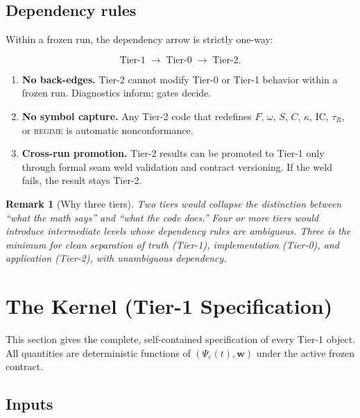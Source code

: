 \documentclass[
  aps,
  prd,
  twocolumn,
  superscriptaddress,
  nofootinbib,
  floatfix
]{revtex4-2}
\newtheorem{remark}{Remark}
\newcommand{\tR}{\tau_{\!R}}
\newcommand{\eps}{\varepsilon}
\newcommand{\beq}{\begin{equation}}
\newcommand{\eeq}{\end{equation}}
\newcommand{\regime}[1]{\textrm{\scshape#1}}
\newcommand{\wvec}{\mathbf{w}}
\newcommand{\IC}{\mathrm{IC}}
\begin{document}
\subsection{Dependency rules}

Within a frozen run, the dependency arrow is strictly one-way:

\beq
  \text{Tier-1} \;\longrightarrow\; \text{Tier-0}
  \;\longrightarrow\; \text{Tier-2}.
\eeq

\begin{enumerate}[leftmargin=*,label=(\alph*)]
\item \textbf{No back-edges.}  Tier-2 cannot modify Tier-0 or
  Tier-1 behavior within a frozen run.  Diagnostics inform;
  gates decide.

\item \textbf{No symbol capture.}  Any Tier-2 code that redefines
  $F$, $\omega$, $S$, $C$, $\kappa$, $\IC$, $\tR$, or
  \regime{regime} is automatic nonconformance.

\item \textbf{Cross-run promotion.}  Tier-2 results can be promoted
  to Tier-1 only through formal seam weld validation and contract
  versioning.  If the weld fails, the result stays Tier-2.
\end{enumerate}

\begin{remark}[Why three tiers]
Two tiers would collapse the distinction between ``what the math
says'' and ``what the code does.''  Four or more tiers would
introduce intermediate levels whose dependency rules are ambiguous.
Three is the minimum for clean separation of \emph{truth}
(Tier-1), \emph{implementation} (Tier-0), and \emph{application}
(Tier-2), with unambiguous dependency.
\end{remark}


\section{The Kernel (Tier-1 Specification)}\label{sec:kernel}

This section gives the complete, self-contained specification of
every Tier-1 object.  All quantities are deterministic functions
of $(\Psi_\eps(t), \wvec)$ under the active frozen contract.

\subsection{Inputs}
\end{document}
